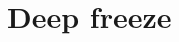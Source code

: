 \documentclass[aip,cha,showpacs,reprint]{revtex4-1} %
\begin{document}
%
%
%



                \ifdraft\newpage
\section{Deep freeze\label{c-freeze}}

                \fi
\end{document}
